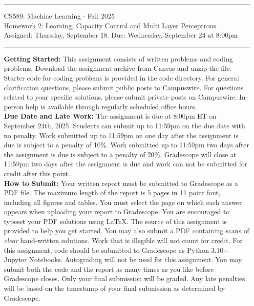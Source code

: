 \documentclass[11pt]{article}
\begin{document}
{\centering
  \rule{6.3in}{2pt}
  \vspace{1em}
  {\Large
    CS589: Machine Learning - Fall 2025\\
    Homework 2: Learning, Capacity Control and Multi Layer Perceptrons\\
  }
  \vspace{1em}
  Assigned: Thursday, September 18. Due: Wednesday, September 24 at 8:00pm \\
  \vspace{0.1em}
  \rule{6.3in}{1.5pt}
}
\vspace{1pc}

\textbf{Getting Started:} This assignment consists of written problems and coding problems. Download the assignment archive from Canvas and unzip the file. Starter code for coding problems is provided in the code directory. For general clarification questions, please submit public posts to Campuswire. For questions related to your specific solutions, please submit private posts on Campuswire. In-person help is available through regularly scheduled office hours. \\

\textbf{Due Date and Late Work:} The assignment is due at 8:00pm ET on September 24th, 2025. Students can submit up to 11:59pm on the due date with no penalty. Work submitted up to 11:59pm on one day after the assignment is due is subject to a penalty of 10\%.  Work submitted up to 11:59pm two days after the assignment is due is subject to a penalty of 20\%. Gradescope will close at 11:59pm two days after the assignment is due and work can not be submitted for credit after this point.\\

\textbf{How to Submit:} Your written report must be submitted to Gradescope as a PDF file. The maximum length of the report is 5 pages in 11 point font, including all figures and tables. You must select the page on which each answer appears when uploading your report to Gradescope. You are encouraged to typeset your PDF solutions using LaTeX. The source of this assignment is provided to help you get started. You may also submit a PDF containing scans of \textit{clear} hand-written solutions. Work that is illegible will not count for credit. For this assignment, code should be submitted to Gradescope as Python 3.10+ Jupyter Notebooks. Autograding will not be used for this assignment. You may submit both the code and the report as many times as you like before Gradescope closes. Only your final submission will be graded. Any late penalties will be based on the timestamp of your final submission as determined by Gradescope. \\
\end{document}
